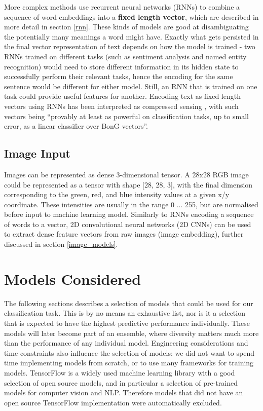 More complex methods use recurrent neural networks (RNNs) to combine a sequence of word embeddings  into a \textbf{fixed length vector},  which are described in more detail in section \ref{rnn}.
These kinds of models are good at  disambiguating the potentially many meanings a word might have.
Exactly what gets persisted in the final  vector representation of text depends on how the model is trained - two RNNs  trained on different tasks (such as sentiment analysis and named entity recognition)  would need to store different information in its hidden state to successfully  perform their relevant tasks,  hence the encoding for the same sentence would be different for either model.
Still, an RNN  that is trained on one task could provide useful features for another.
Encoding text as fixed length vectors using RNNs has been interpreted as compressed sensing \cite{compressed_sensing_rnn}, with such vectors being ``provably at least as powerful on classification tasks, up to small error, as a linear classifier over BonG vectors''.

\subsection{Image Input}

Images can be represented as dense 3-dimensional tensor.
A 28x28 RGB image could be represented as a tensor with shape [28, 28, 3],  with the final dimension corresponding to the green, red, and blue intensity values at a given x/y coordinate.
These intensities  are usually in the range 0 ... 255, but are normalised before input to machine learning model.
Similarly to RNNs  encoding a sequence of words to a vector, 2D convolutional neural networks (2D CNNs)  can be used to extract dense feature vectors from raw images (image embedding),  further discussed in section \ref{image_models}.

\section{Models Considered}
\label{models_considered}

The following sections describes a selection of models that could be used for our classification task.
This is by no means an exhaustive list, nor is it a selection that is expected to have the highest predictive performance individually.
These models will later become part of an ensemble, where diversity matters much more than the performance of any individual model.
Engineering  considerations and time constraints also influence the selection of models: we did not want to spend time implementing models from scratch, or to use many frameworks for training models.
TensorFlow  is a widely used machine learning library with a good selection of open source models, and in particular a selection of pre-trained models for computer vision and NLP.
Therefore models that did not have an open source TensorFlow implementation were automatically excluded.

